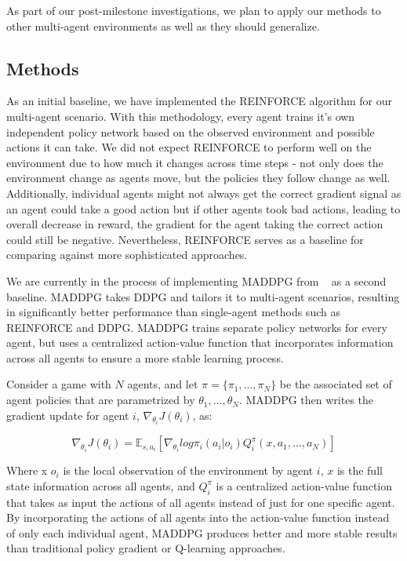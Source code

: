 \documentclass{article}
\begin{document}
As part of our post-milestone investigations, we plan to apply our methods to other multi-agent environments as well as they should generalize.

\subsection{Methods}
As an initial baseline, we have implemented the REINFORCE algorithm for our multi-agent scenario. With this methodology, every agent trains it's own independent policy network based on the observed environment and possible actions it can take. We did not expect REINFORCE to perform well on the environment due to how much it changes across time steps - not only does the environment change as agents move, but the policies they follow change as well. Additionally, individual agents might not always get the correct gradient signal as an agent could take a good action but if other agents took bad actions, leading to overall decrease in reward, the gradient for the agent taking the correct action could still be negative. Nevertheless, REINFORCE serves as a baseline for comparing against more sophisticated approaches.

We are currently in the process of implementing MADDPG from ~\cite{maddpg} as a second baseline. MADDPG takes DDPG and tailors it to multi-agent scenarios, resulting in significantly better performance than single-agent methods such as REINFORCE and DDPG. MADDPG trains separate policy networks for every agent, but uses a centralized action-value function that incorporates information across all agents to ensure a more stable learning process. 

Consider a game with $N$ agents, and let $\pi = \{\pi_1, ..., \pi_N\}$ be the associated set of agent policies that are parametrized by $\theta_1, ..., \theta_N$. MADDPG then writes the gradient update for agent $i$, $\nabla_{\theta_i} J(\theta_i)$, as:

$$\nabla_{\theta_i}J(\theta_i) = \mathbb{E}_{s, a_i}[\nabla_{\theta_i}log \pi_i(a_i|o_i)Q^{\pi}_i(x, a_1, ..., a_N)]$$

Where x $o_i$ is the local observation of the environment by agent $i$, $x$ is the full state information across all agents, and $Q^{\pi}_i$ is a centralized action-value function that takes as input the actions of all agents instead of just for one specific agent. By incorporating the actions of all agents into the action-value function instead of only each individual agent, MADDPG produces better and more stable results than traditional policy gradient or Q-learning approaches.
\end{document}
